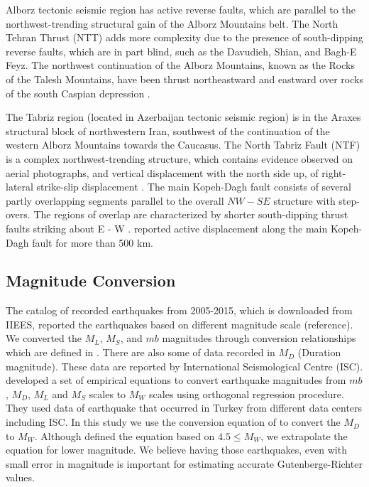 \noindent
Alborz tectonic seismic region has active reverse faults, which are parallel to the northwest-trending structural gain of the Alborz Mountains belt. The North Tehran Thrust (NTT) adds more complexity due to the presence of south-dipping reverse faults, which are in part blind, such as the Davudieh, Shian, and Bagh-E Feyz.
The northwest continuation of the Alborz Mountains, known as the Rocks of the Talesh Mountains, have been thrust northeastward and eastward over rocks of the south Caspian depression \citep{Berberian1999}. 

\noindent
 The Tabriz region (located in Azerbaijan tectonic seismic region) is in the Araxes structural block of northwestern Iran, southwest of the continuation of the western Alborz Mountains towards the Caucasus. The North Tabriz Fault (NTF) is a complex northwest-trending structure, which contains evidence observed on aerial photographs, and vertical displacement with the north side up, of right-lateral strike-slip displacement \citep{Berberian1999}.
\noindent
The main Kopeh-Dagh fault consists of several partly overlapping segments parallel to the overall $NW - SE$ structure with step-overs. The regions of overlap are characterized by shorter south-dipping thrust faults striking about E - W \citep{Berberian2001}. \citet{Trifonov1978} reported active displacement along the main Kopeh-Dagh fault for more than 500 km. 

\subsection{Magnitude Conversion}
\noindent
The catalog of recorded earthquakes from 2005-2015, which is downloaded from IIEES, reported the earthquakes based on different magnitude scale (reference). We converted the $M_L$, $M_S$, and $mb$ magnitudes through conversion relationships which are defined in \citet{Zare2014}. There are also some of data recorded in $M_D$ (Duration magnitude). These data are reported by International Seismological Centre (ISC).  \citet{Deniz2010} developed a set of empirical equations to convert earthquake magnitudes from $mb$, $M_D$, $M_L$ and $M_S$ scales to $M_W$ scales using orthogonal regression procedure. They used data of earthquake that occurred in Turkey from different data centers including ISC. In this study we use the conversion equation of \citet{Deniz2010} to convert the $M_D$ to $M_W$. Although \citet{Deniz2010} defined the equation based on $4.5\leqslant M_W$, we extrapolate the equation for lower magnitude. We believe having those earthquakes, even with small error  in magnitude is important for estimating accurate  Gutenberge-Richter values.

